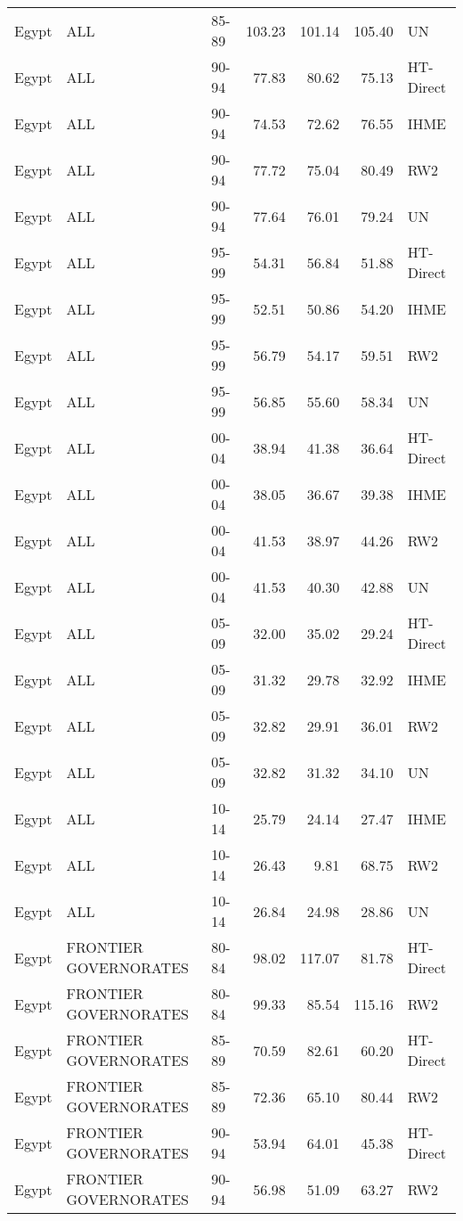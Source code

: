 \begin{longtable}{lllrrrl}
  Egypt & ALL & 85-89 & 103.23 & 101.14 & 105.40 & UN \\ 
  Egypt & ALL & 90-94 & 77.83 & 80.62 & 75.13 & HT-Direct \\ 
  Egypt & ALL & 90-94 & 74.53 & 72.62 & 76.55 & IHME \\ 
  Egypt & ALL & 90-94 & 77.72 & 75.04 & 80.49 & RW2 \\ 
  Egypt & ALL & 90-94 & 77.64 & 76.01 & 79.24 & UN \\ 
  Egypt & ALL & 95-99 & 54.31 & 56.84 & 51.88 & HT-Direct \\ 
  Egypt & ALL & 95-99 & 52.51 & 50.86 & 54.20 & IHME \\ 
  Egypt & ALL & 95-99 & 56.79 & 54.17 & 59.51 & RW2 \\ 
  Egypt & ALL & 95-99 & 56.85 & 55.60 & 58.34 & UN \\ 
  Egypt & ALL & 00-04 & 38.94 & 41.38 & 36.64 & HT-Direct \\ 
  Egypt & ALL & 00-04 & 38.05 & 36.67 & 39.38 & IHME \\ 
  Egypt & ALL & 00-04 & 41.53 & 38.97 & 44.26 & RW2 \\ 
  Egypt & ALL & 00-04 & 41.53 & 40.30 & 42.88 & UN \\ 
  Egypt & ALL & 05-09 & 32.00 & 35.02 & 29.24 & HT-Direct \\ 
  Egypt & ALL & 05-09 & 31.32 & 29.78 & 32.92 & IHME \\ 
  Egypt & ALL & 05-09 & 32.82 & 29.91 & 36.01 & RW2 \\ 
  Egypt & ALL & 05-09 & 32.82 & 31.32 & 34.10 & UN \\ 
  Egypt & ALL & 10-14 & 25.79 & 24.14 & 27.47 & IHME \\ 
  Egypt & ALL & 10-14 & 26.43 & 9.81 & 68.75 & RW2 \\ 
  Egypt & ALL & 10-14 & 26.84 & 24.98 & 28.86 & UN \\ 
  Egypt & FRONTIER GOVERNORATES & 80-84 & 98.02 & 117.07 & 81.78 & HT-Direct \\ 
  Egypt & FRONTIER GOVERNORATES & 80-84 & 99.33 & 85.54 & 115.16 & RW2 \\ 
  Egypt & FRONTIER GOVERNORATES & 85-89 & 70.59 & 82.61 & 60.20 & HT-Direct \\ 
  Egypt & FRONTIER GOVERNORATES & 85-89 & 72.36 & 65.10 & 80.44 & RW2 \\ 
  Egypt & FRONTIER GOVERNORATES & 90-94 & 53.94 & 64.01 & 45.38 & HT-Direct \\ 
  Egypt & FRONTIER GOVERNORATES & 90-94 & 56.98 & 51.09 & 63.27 & RW2 \\ 

\end{longtable}
